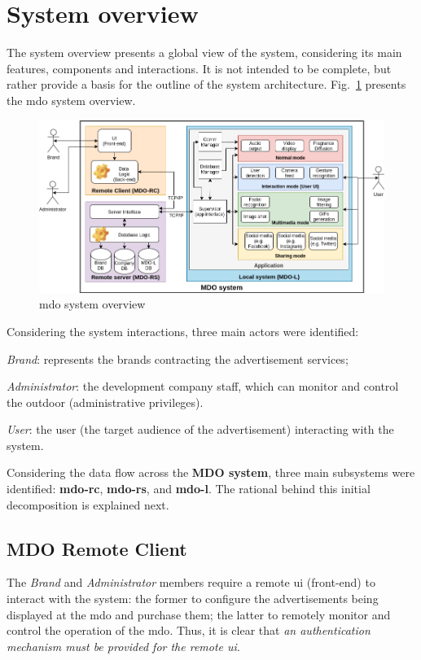 %
\section{System overview}
\label{sec:system-overview}
The system overview presents a global view of the system, considering its main
features, components and interactions. It is not intended to be complete, but
rather provide a basis for the outline of the system architecture.
Fig.~\ref{fig:sys-overview} presents the \gls{mdo} system overview.
%
\begin{figure}[htb!]
\centering
    \includegraphics[width=1.0\columnwidth]{./img/sys-overview.png}
  \caption{\gls{mdo} system overview}%
\label{fig:sys-overview}
\end{figure}

Considering the system interactions, three main actors were identified:
\begin{enum-c}
\item \emph{Brand}: represents the brands contracting the advertisement
  services;
\item \emph{Administrator}: the development company staff, which can monitor and
  control the outdoor (administrative privileges).
\item \emph{User}: the user (the target audience of the advertisement)
  interacting with the system.
\end{enum-c}

Considering the data flow across the \textbf{MDO system}, three main subsystems were
identified: \textbf{\gls{mdo-rc}}, \textbf{\gls{mdo-rs}}, and
\textbf{\gls{mdo-l}}. The rational behind this initial decomposition is
explained next.

\subsection{MDO Remote Client}
The \emph{Brand} and \emph{Administrator} members require a remote \gls{ui} (front-end) to
interact with the system: the former to configure the advertisements being
displayed at the \gls{mdo} and purchase them; the latter to remotely monitor and
control the operation of the \gls{mdo}. Thus, it is clear that \emph{an
  authentication mechanism must be provided for the remote \gls{ui}}.


